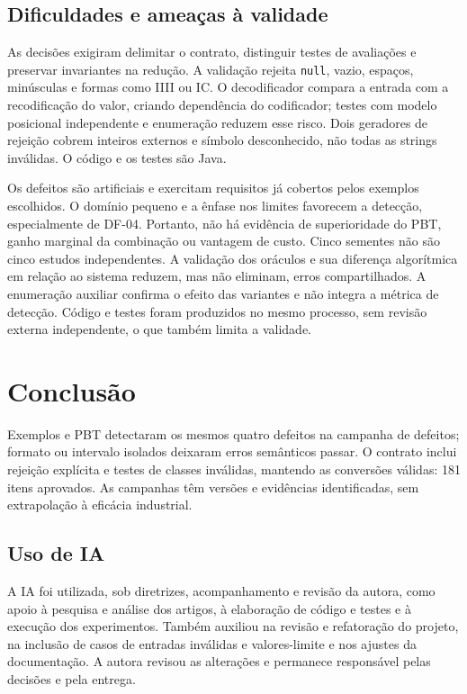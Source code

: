 \documentclass[11pt,a4paper]{article}
\newcommand{\code}[1]{\texttt{#1}}
\begin{document}
\subsection{Dificuldades e ameaças à validade}
As decisões exigiram delimitar o contrato, distinguir testes de avaliações e preservar invariantes na redução. A validação rejeita \code{null}, vazio, espaços, minúsculas e formas como IIII ou IC. O decodificador compara a entrada com a recodificação do valor, criando dependência do codificador; testes com modelo posicional independente e enumeração reduzem esse risco. Dois geradores de rejeição cobrem inteiros externos e símbolo desconhecido, não todas as strings inválidas. O código e os testes são Java.

Os defeitos são artificiais e exercitam requisitos já cobertos pelos exemplos escolhidos. O domínio pequeno e a ênfase nos limites favorecem a detecção, especialmente de DF-04. Portanto, não há evidência de superioridade do PBT, ganho marginal da combinação ou vantagem de custo. Cinco sementes não são cinco estudos independentes. A validação dos oráculos e sua diferença algorítmica em relação ao sistema reduzem, mas não eliminam, erros compartilhados. A enumeração auxiliar confirma o efeito das variantes e não integra a métrica de detecção. Código e testes foram produzidos no mesmo processo, sem revisão externa independente, o que também limita a validade.

\section{Conclusão}
Exemplos e PBT detectaram os mesmos quatro defeitos na campanha de defeitos; formato ou intervalo isolados deixaram erros semânticos passar. O contrato inclui rejeição explícita e testes de classes inválidas, mantendo as conversões válidas: 181 itens aprovados. As campanhas têm versões e evidências identificadas, sem extrapolação à eficácia industrial.

\subsection*{Uso de IA}
A IA foi utilizada, sob diretrizes, acompanhamento e revisão da autora, como apoio à pesquisa e análise dos artigos, à elaboração de código e testes e à execução dos experimentos. Também auxiliou na revisão e refatoração do projeto, na inclusão de casos de entradas inválidas e valores-limite e nos ajustes da documentação. A autora revisou as alterações e permanece responsável pelas decisões e pela entrega.
\end{document}
